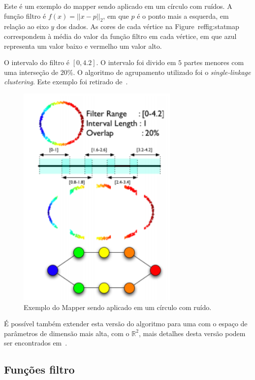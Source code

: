 \begin{ex}
    Este é um exemplo do mapper sendo aplicado em um círculo com ruídos. A função filtro
    é $f(x) = || x - p ||_2$, em que $p$ é o ponto mais a esquerda, em relação ao eixo $y$
    dos dados. As cores de cada vértice na Figure~ref{fig:statmap} correspondem à média
    do valor da função filtro em cada vértice, em que azul representa um valor baixo e 
    vermelho um valor alto. 

    O intervalo do filtro é $[0,4.2]$. O intervalo foi divido em $5$ partes menores com uma
    interseção de $20\%$. O algoritmo de agrupamento utilizado foi o \textit{single-linkage
    clustering}. Este exemplo foi retirado de~\cite{mapper}. 
    \begin{figure}
        \centering
        \includegraphics[width=0.7\textwidth]{images/statmap.png}
        \caption{Exemplo do Mapper sendo aplicado em um círculo com ruído.}
        \label{fig:statmap}
        \fautor
    \end{figure}
\end{ex} 

É possível também extender esta versão do algoritmo para uma com o espaço de parâmetros de dimensão
mais alta, com o $\mathbb{R}^2$, mais detalhes desta versão podem ser encontrados em~\cite{mapper}.

\subsection{Funções filtro}

